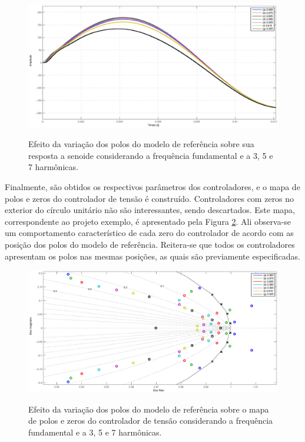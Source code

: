 \documentclass[repeatfields,oneside]{tcc}
\begin{document}
\begin{figure}[h]
    \centering
    \caption{Efeito da variação dos polos do modelo de referência sobre sua resposta a senoide considerando a frequência fundamental e a 3{\textordfeminine}, 5{\textordfeminine} e 7{\textordfeminine} harmônicas.}
    \includegraphics[trim={80 25 80 43}, clip, width=0.78\linewidth]{fig/sinsim_M_7.eps}
    \\
    \label{fig:sinsim_M_7}
\end{figure}

Finalmente, são obtidos os respectivos parâmetros dos controladores, e o mapa de polos e zeros do controlador de tensão é construído.
Controladores com zeros no exterior do círculo unitário não são interessantes, sendo descartados.
Este mapa, correspondente ao projeto exemplo, é apresentado pela Figura \ref{fig:pz_C1_7}.
Ali observa-se um comportamento característico de cada zero do controlador de acordo com as posição dos polos do modelo de referência.
Reitera-se que todos os controladores apresentam os polos nas mesmas posições, as quais são previamente especificadas.

\begin{figure}[h]
    \centering
    \caption{Efeito da variação dos polos do modelo de referência sobre o mapa de polos e zeros do controlador de tensão considerando a frequência fundamental e a 3{\textordfeminine}, 5{\textordfeminine} e 7{\textordfeminine} harmônicas.}
    \includegraphics[trim={80 25 80 43}, clip, width=0.78\linewidth]{fig/pz_C1_7.eps}
    \\
    \label{fig:pz_C1_7}
\end{figure}
\end{document}
